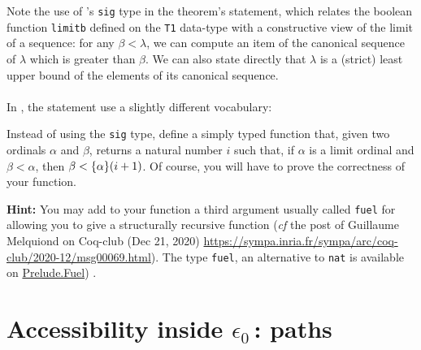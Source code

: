 

\label{lemma:canonS-limit}


Note the use of \coq's \texttt{sig} type in the theorem's statement, which
relates the boolean function \texttt{limitb} defined on the \texttt{T1} data-type with a constructive view of the limit of a sequence: for any $\beta<\lambda$, we can compute an item of the canonical sequence of $\lambda$ which is greater than $\beta$.
We can also state directly that $\lambda$ is a (strict) least upper bound of the elements of its canonical sequence.



\paragraph*{\gaiasign}  In \gaiaHydras, the statement use a slightly different vocabulary:



\begin{exercise}\label{exo:simply-typed-canonseq}
Instead of using the \texttt{sig} type, define a simply typed function that, given two ordinals $\alpha$ and $\beta$, returns a natural number $i$ such that, if $\alpha$ is a limit ordinal and $\beta<\alpha$, then $\beta< \mbox{$\{\alpha\}(i+1)$}$. Of course, you will have to prove the correctness of your function. 

\textbf{Hint:} You may add to your function a third argument usually called \texttt{fuel} for allowing you to give a structurally 
recursive function (\emph{cf} the post of Guillaume Melquiond on Coq-club (Dec 21, 2020)
\url{https://sympa.inria.fr/sympa/arc/coq-club/2020-12/msg00069.html}).
The type \texttt{fuel}, an alternative 
to \texttt{nat} is available on \href{../theories/html/hydras.Prelude.Fuel.html}{Prelude.Fuel})
.

\end{exercise}






\section{Accessibility inside \texorpdfstring{$\epsilon_0$}{epsilon0}\,: paths}
\label{sect:pathes-intro}

